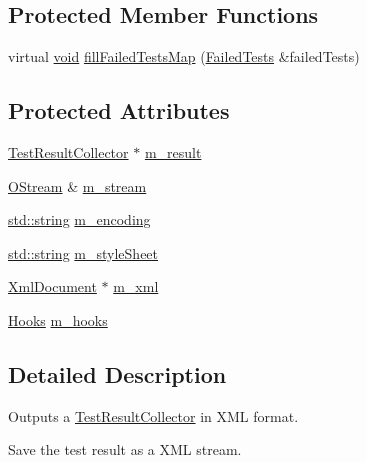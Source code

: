 \subsection*{Protected Member Functions}
\begin{DoxyCompactItemize}
\item 
virtual \hyperlink{wglew_8h_aeea6e3dfae3acf232096f57d2d57f084}{void} \hyperlink{class_xml_outputter_a063afe5aaec2936d53ba58c45b5bdb54}{fill\-Failed\-Tests\-Map} (\hyperlink{class_xml_outputter_a987608d04ba56dcc13461c9522f3da7e}{Failed\-Tests} \&failed\-Tests)
\end{DoxyCompactItemize}
\subsection*{Protected Attributes}
\begin{DoxyCompactItemize}
\item 
\hyperlink{class_test_result_collector}{Test\-Result\-Collector} $\ast$ \hyperlink{class_xml_outputter_a982002691814b46b0fe8ca79a74d8895}{m\-\_\-result}
\item 
\hyperlink{_stream_8h_a80291a4e32881b445c8d4f839a9dd979}{O\-Stream} \& \hyperlink{class_xml_outputter_a6f7eb773760301d381ba7f3ca5729bca}{m\-\_\-stream}
\item 
\hyperlink{glew_8h_ae84541b4f3d8e1ea24ec0f466a8c568b}{std\-::string} \hyperlink{class_xml_outputter_a193e314a66971eec760045fc20e5a2d1}{m\-\_\-encoding}
\item 
\hyperlink{glew_8h_ae84541b4f3d8e1ea24ec0f466a8c568b}{std\-::string} \hyperlink{class_xml_outputter_a83e00800a42c2a62127e335f28b58230}{m\-\_\-style\-Sheet}
\item 
\hyperlink{class_xml_document}{Xml\-Document} $\ast$ \hyperlink{class_xml_outputter_a7c789c60c2031edc2527e75e736612cb}{m\-\_\-xml}
\item 
\hyperlink{class_xml_outputter_a721fa60bda8d779457ae8e429be21d74}{Hooks} \hyperlink{class_xml_outputter_a54643e72aed488db22338cb878be2c81}{m\-\_\-hooks}
\end{DoxyCompactItemize}


\subsection{Detailed Description}
Outputs a \hyperlink{class_test_result_collector}{Test\-Result\-Collector} in X\-M\-L format.

Save the test result as a X\-M\-L stream. 


